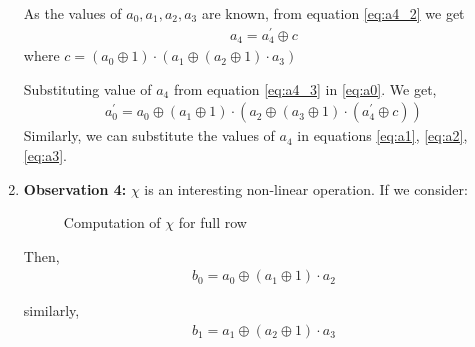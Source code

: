 \begin{enumerate}
As the values of $a_0,a_1,a_2,a_3$ are known, from equation \ref{eq:a4_2} we get
\begin{align}\label{eq:a4_3}
a_4 = a_4^\prime \oplus c
\end{align}
where $c = \left( a_{0} \oplus 1\right) \cdot \left( a_{1} \oplus \left( a_{2} \oplus 1 \right) \cdot a_{3}\right) $

Substituting value of $a_4$ from equation \ref{eq:a4_3} in \ref{eq:a0}. We get, 
\begin{align}\label{eq:a0_2}
a_0^\prime = a_0 \oplus \left( a_{1} \oplus 1\right) \cdot \left( a_{2} \oplus \left( a_{3} \oplus 1 \right) \cdot \left( a_4^\prime \oplus c \right)  \right)
\end{align}
Similarly, we can substitute the values of $a_4$ in equations \ref{eq:a1}, \ref{eq:a2}, \ref{eq:a3}.

\item \label{ob4}\textbf{Observation 4:} $\chi$ is an interesting non-linear operation. If we consider:
\begin{figure}[H]
    \begin{center}
    \end{center}
    \caption{Computation of $\chi$ for full row \label{chi_inv}}
\end{figure}

Then,
\begin{align}\label{eq:b0}
b_0 = a_0 \oplus \left( a_1 \oplus 1 \right) \cdot a_2
\end{align}

similarly,
\begin{align}\label{eq:b1}
b_1 = a_1 \oplus \left( a_2 \oplus 1 \right) \cdot a_3
\end{align}


\end{enumerate}
